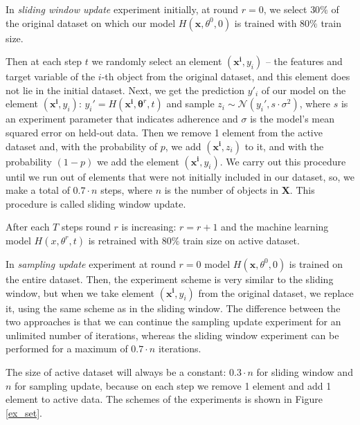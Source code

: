 \documentclass{article}
\begin{document}
        In \textit{sliding window update} experiment \cite{khritankov2021hidden} initially, at round $r = 0$, we select $30\%$ of the original dataset on which our model $H(\mathbf{x}, \theta^0, 0)$ is trained with $80\%$ train size. 

        
        Then at each step $t$ we randomly select an element $(\mathbf{x^i}, y_i)$ -- the features and target variable of the $i$-th object from the original dataset, and this element does not lie in the initial dataset. Next, we get the prediction $y'_i$ of our model on the element $(\mathbf{x^i}, y_i)$: $y_i'=H(\mathbf{x^i}, \mathbf{\theta}^r, t)$ and sample $z_i \sim \mathcal{N}(y_i', s \cdot \sigma^2)$, where $s$ is an experiment parameter that indicates adherence and $\sigma$ is the model's mean squared error on held-out data. Then we remove 1 element from the active dataset and, with the probability of $p$, we add $(\mathbf{x^i}, z_i)$ to it, and with the probability $(1-p)$ we add the element $(\mathbf{x^i}, y_i)$. We carry out this procedure until we run out of elements that were not initially included in our dataset, so, we make a total of $0.7 \cdot n$ steps, where $n$ is the number of objects in $\textbf{X}$. This procedure is called sliding window update.

        After each $T$ steps round $r$ is increasing: $r = r+1$ and the machine learning model $H(x, \theta^r, t)$ is retrained with $80\%$ train size on active dataset.

        In \textit{sampling update} experiment at round $r = 0$ model $H(\mathbf{x}, \theta^0, 0)$ is trained on the entire dataset. Then, the experiment scheme is very similar to the sliding window, but when we take element $(\mathbf{x^i}, y_i)$ from the original dataset, we replace it, using the same scheme as in the sliding window. The difference between the two approaches is that we can continue the sampling update experiment for an unlimited number of iterations, whereas the sliding window experiment can be performed for a maximum of $0.7 \cdot n$ iterations. 

        The size of active dataset will always be a constant: $0.3 \cdot n$ for sliding window and $n$ for sampling update, because on each step we remove 1 element and add 1 element to active data. The schemes of the experiments is shown in Figure \ref{ex_set}.
\end{document}
